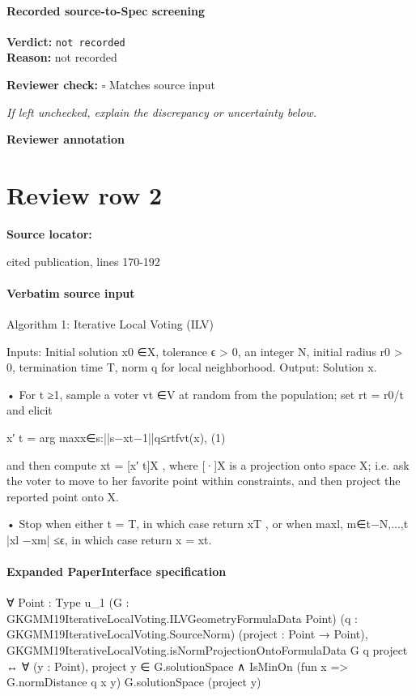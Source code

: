 \documentclass[10pt]{article}
\newcommand{\reviewerbox}{%
  \par\noindent\fbox{\parbox{0.96\linewidth}{\rule{0pt}{0.38in}}}\par
}
\newcommand{\reviewmatch}[1]{%
  \par\noindent\textbf{Reviewer check:} $\square$\; #1\par
  \noindent\emph{If left unchecked, explain the discrepancy or uncertainty below.}\par
}
\begin{document}
\paragraph{Recorded source-to-Spec screening}
\textbf{Verdict:} \texttt{not recorded}
\\
\textbf{Reason:} not recorded
\reviewmatch{Matches source input}
\noindent\textbf{Reviewer annotation}\par
\reviewerbox
\clearpage
\hypertarget{source-claim-8457e0d182fe249b}{}
\section*{Review row 2}
\textbf{Source locator:} {\footnotesize\raggedright cited publication, lines 170-\allowbreak{}192\par}
\paragraph{Verbatim source input}
\begin{ReviewVerbatim}
Algorithm 1: Iterative Local Voting (ILV)

Inputs:
Initial solution x0 ∈X, tolerance ϵ > 0, an integer N, initial radius r0 > 0,
termination time T, norm q for local neighborhood.
Output:
Solution x.

• For t ≥1, sample a voter vt ∈V at random from the population; set rt = r0/t
and elicit

x′
t = arg maxx∈{s:||s−xt−1||q≤rt}fvt(x),
(1)

and then compute xt = [x′
t]X , where [·]X is a projection onto space X; i.e. ask
the voter to move to her favorite point within constraints, and then project the
reported point onto X.

• Stop when either t = T, in which case return xT , or when
maxl, m∈{t−N,...,t} |xl −xm| ≤ϵ, in which case return x = xt.
\end{ReviewVerbatim}


\paragraph{Expanded PaperInterface specification}
\begin{ReviewVerbatim}
∀ {Point : Type u_1} (G : GKGMM19IterativeLocalVoting.ILVGeometryFormulaData Point)
  (q : GKGMM19IterativeLocalVoting.SourceNorm) (project : Point → Point),
  GKGMM19IterativeLocalVoting.isNormProjectionOntoFormulaData G q project ↔
    ∀ (y : Point), project y ∈ G.solutionSpace ∧ IsMinOn (fun x => G.normDistance q x y) G.solutionSpace (project y)
\end{ReviewVerbatim}
\end{document}

